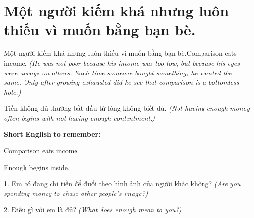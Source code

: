 \section{Một người kiếm khá nhưng luôn thiếu vì muốn bằng bạn bè.}
\begin{truyen}{Một người kiếm khá nhưng luôn thiếu vì muốn bằng bạn bè.}{Comparison eats income.}
\textit{(He was not poor because his income was too low, but because his eyes were always on others. Each time someone bought something, he wanted the same. Only after growing exhausted did he see that comparison is a bottomless hole.)}
\end{truyen}
\begin{baihoc}
Tiền không đủ thường bắt đầu từ lòng không biết đủ.
\textit{(Not having enough money often begins with not having enough contentment.)}
\end{baihoc}
\begin{ghinhoanh}
\textbf{Short English to remember:}

Comparison eats income.

Enough begins inside.
\end{ghinhoanh}
\begin{tuhocnhanh}
1. Em có đang chi tiền để đuổi theo hình ảnh của người khác không? \textit{(Are you spending money to chase other people's image?)}

2. Điều gì với em là đủ? \textit{(What does enough mean to you?)}
\end{tuhocnhanh}
\ngancach

